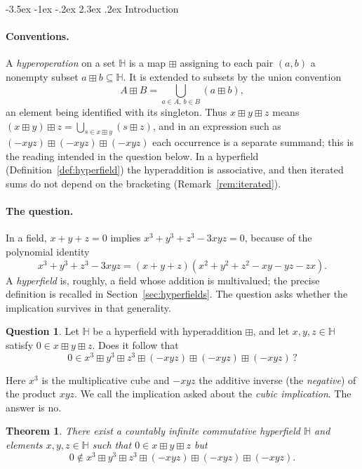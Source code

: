 \documentclass[11pt]{article}
\makeatletter
\renewcommand\section{\@startsection{section}{1}{\z@}
  {-3.5ex \@plus -1ex \@minus -.2ex}
  {2.3ex \@plus.2ex}
  {\normalfont\bfseries}}
\theoremstyle{plain}
\newtheorem{theorem}{Theorem}[section]
\theoremstyle{definition}
\newtheorem*{question}{Question}
\newcommand{\Hh}{\mathbb{H}}
\newcommand{\bp}{\boxplus}
\makeatother
\begin{document}
\section{Introduction}\label{sec:intro}

\paragraph{Conventions.}
A \emph{hyperoperation} on a set $\Hh$ is a map $\bp$ assigning to each
pair $(a,b)$ a nonempty subset $a\bp b\subseteq\Hh$.  It is extended to
subsets by the union convention
\begin{equation}\label{eq:union}
 A\bp B=\bigcup_{a\in A,\ b\in B}(a\bp b),
\end{equation}
an element being identified with its singleton.  Thus
$x\bp y\bp z$ means $(x\bp y)\bp z=\bigcup_{s\in x\bp y}(s\bp z)$, and
in an expression such as $(-xyz)\bp(-xyz)\bp(-xyz)$ each occurrence is a
separate summand; this is the reading intended in the question below.
In a hyperfield (Definition~\ref{def:hyperfield}) the hyperaddition is
associative, and then iterated sums do not depend on the bracketing
(Remark~\ref{rem:iterated}).

\paragraph{The question.}
In a field, $x+y+z=0$ implies $x^3+y^3+z^3-3xyz=0$, because of the
polynomial identity
\begin{equation}\label{eq:cubic}
 x^3+y^3+z^3-3xyz=(x+y+z)(x^2+y^2+z^2-xy-yz-zx).
\end{equation}
A \emph{hyperfield} is, roughly, a field whose addition is multivalued;
the precise definition is recalled in Section~\ref{sec:hyperfields}.
The question asks whether the implication survives in that generality.

\begin{question}
Let $\Hh$ be a hyperfield with hyperaddition $\bp$, and let
$x,y,z\in\Hh$ satisfy $0\in x\bp y\bp z$.  Does it follow that
\[
 0\in x^3\bp y^3\bp z^3\bp(-xyz)\bp(-xyz)\bp(-xyz)\,?
\]
\end{question}

\noindent
Here $x^3$ is the multiplicative cube and $-xyz$ the additive inverse
(the \emph{negative}) of the product $xyz$.  We call the implication
asked about the \emph{cubic implication}.  The answer is no.

\begin{theorem}\label{thm:main}
There exist a countably infinite commutative hyperfield $\Hh$ and
elements $x,y,z\in\Hh$ such that $0\in x\bp y\bp z$ but
\[
 0\notin x^3\bp y^3\bp z^3\bp(-xyz)\bp(-xyz)\bp(-xyz).
\]
\end{theorem}
\end{document}
